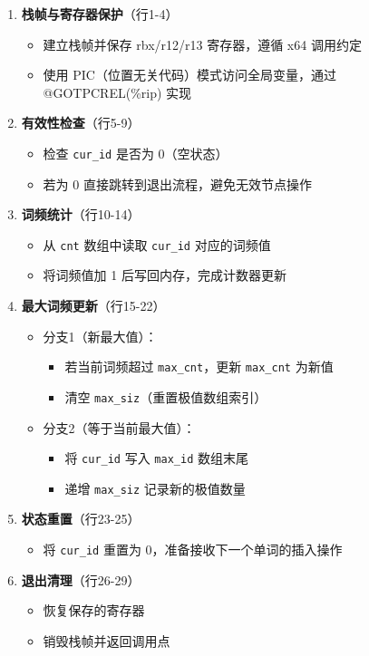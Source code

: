 \documentclass[10pt,a4paper]{article}
\begin{document}
\begin{enumerate}
    \item \textbf{栈帧与寄存器保护}（行1-4）
    \begin{itemize}
        \item 建立栈帧并保存 rbx/r12/r13 寄存器，遵循 x64 调用约定
        \item 使用 PIC（位置无关代码）模式访问全局变量，通过 @GOTPCREL(\%rip) 实现
    \end{itemize}
    
    \item \textbf{有效性检查}（行5-9）
    \begin{itemize}
        \item 检查 \verb |cur_id| 是否为 0（空状态）
        \item 若为 0 直接跳转到退出流程，避免无效节点操作
    \end{itemize}
    
    \item \textbf{词频统计}（行10-14）
    \begin{itemize}
        \item 从 \verb|cnt| 数组中读取 \verb |cur_id| 对应的词频值
        \item 将词频值加 1 后写回内存，完成计数器更新
    \end{itemize}
    
    \item \textbf{最大词频更新}（行15-22）
    \begin{itemize}
        \item 分支1（新最大值）：
        \begin{itemize}
            \item 若当前词频超过 \verb|max_cnt|，更新 \verb|max_cnt| 为新值
            \item 清空 \verb|max_siz|（重置极值数组索引）
        \end{itemize}
        \item 分支2（等于当前最大值）：
        \begin{itemize}
            \item 将 \verb|cur_id| 写入 \verb|max_id| 数组末尾
            \item 递增 \verb|max_siz| 记录新的极值数量
        \end{itemize}
    \end{itemize}
    
    \item \textbf{状态重置}（行23-25）
    \begin{itemize}
        \item 将 \verb|cur_id| 重置为 0，准备接收下一个单词的插入操作
    \end{itemize}
    
    \item \textbf{退出清理}（行26-29）
    \begin{itemize}
        \item 恢复保存的寄存器
        \item 销毁栈帧并返回调用点
    \end{itemize}
\end{enumerate}
\end{document}
